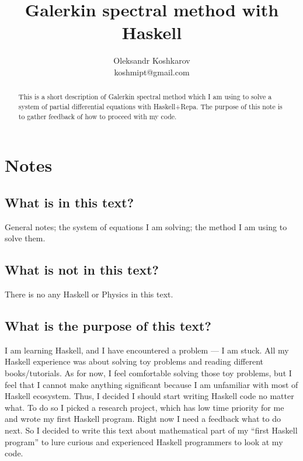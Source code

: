 \documentclass[preprint,aip,pop]{article}
\date{}
\begin{document}
\title{Galerkin spectral method with Haskell}
\author{Oleksandr Koshkarov\\\small{koshmipt@gmail.com}}

\maketitle

\begin{abstract}
    This is a short description of Galerkin spectral method which I am using to
    solve a system of partial differential equations with Haskell+Repa.
    The purpose of this note is to gather feedback of how to proceed with my code.
\end{abstract}

\section{Notes}
\subsection{What is in this text?}
General notes; the system of equations I am solving; the method I am using to solve them.
\subsection{What is not in this text?}
There is no any Haskell or Physics in this text.
\subsection{What is the purpose of this text?}
I am learning Haskell, and I have encountered a problem --- I am stuck.
All my Haskell experience was about solving toy problems and reading different
books/tutorials. As for now, I feel comfortable solving those toy problems, but
I feel that I cannot make anything significant because I am unfamiliar with
most of Haskell ecosystem. Thus, I decided I should start writing Haskell code no
matter what. 
To do so I picked a research project, which has low time priority for me and
wrote my first Haskell program.
Right now I need a feedback what to do next.
So I decided to write this text about mathematical part of my ``first Haskell
program'' to lure curious and experienced Haskell programmers to look at my code.
\end{document}
